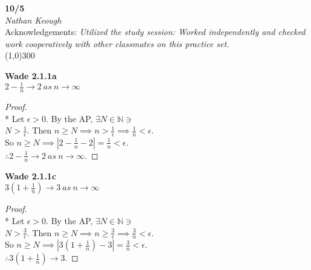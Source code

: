 \documentclass[a4paper]{article}
\newcommand{\nat}{\mathbb{N}}
\begin{document}
    \begin{center}
        \Large \textbf{10/5} \\
        \large \textit{Nathan Keough} \\
        Acknowledgements: \emph{Utilized the study session: Worked independently and checked work cooperatively with other classmates on this practice set.} \vspace{.5pc} \\ \line(1,0){300} 
        \vspace{1pc}
    \end{center} 
    
    \begin{flushleft}


        \textbf{Wade 2.1.1a} \\
        $2 - \frac{1}{n}\rightarrow 2\ as \ n \to \infty$ 
        \begin{proof}\mbox{}\\*
            Let $\epsilon > 0$. By the AP, $\exists N \in \nat \ni$ \\
            $N > \frac{1}{\epsilon}$. Then $n \geq N \implies n > \frac{1}{\epsilon} \implies \frac{1}{n} < \epsilon$.\\
            So $n \geq N \implies |2 - \frac{1}{n} -2| = \frac{1}{n} < \epsilon$. \\
            $\therefore 2 - \frac{1}{n} \to 2 \ as \ n \to \infty$. 
            
        \end{proof}


        \textbf{Wade 2.1.1c} \\
        $3 \left(1 + \frac{1}{n}\right) \rightarrow3\ as\ n \to \infty$
        \begin{proof}\mbox{}\\*
            Let $\epsilon > 0$. By the AP, $\exists N \in \nat \ni$ \\
            $N > \frac{3}{\epsilon}$. Then $n \geq N \implies n \geq \frac{3}{\epsilon} \implies \frac{3}{n} < \epsilon$.\\
            So $n \geq N \implies |3\left(1+\frac{1}{n}\right) -3| = \frac{3}{n} < \epsilon$. \\
            $\therefore 3 \left(1 + \frac{1}{n}\right) \to 3$. 

            
        \end{proof}


\end{flushleft}
\end{document}
